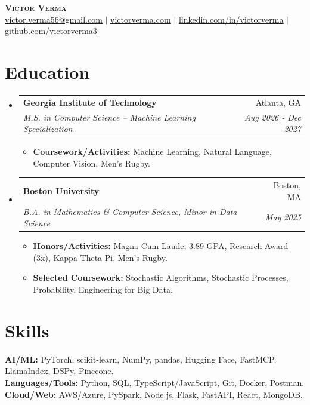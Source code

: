 \documentclass[letterpaper,11pt]{article}
\makeatletter
\newcommand{\resumeItem}[1]{
  \item\small{
    {#1 \vspace{-2pt}}
  }
}
\newcommand{\resumeSubheading}[4]{
  \vspace{-2pt}\item
    \begin{tabular*}{0.97\textwidth}[t]{l@{\extracolsep{\fill}}r}
      \textbf{#1} & #2 \\
      \textit{\small#3} & \textit{\small #4} \\
    \end{tabular*}\vspace{-7pt}
}
\newcommand{\resumeSubHeadingListStart}{\begin{itemize}[leftmargin=0.15in, label={}]}
\newcommand{\resumeSubHeadingListEnd}{\end{itemize}}
\newcommand{\resumeItemListStart}{\begin{itemize}}
\newcommand{\resumeItemListEnd}{\end{itemize}\vspace{-5pt}}
\makeatother
\begin{document}
\begin{center}
    \textbf{\Large \scshape Victor Verma} \\ \vspace{1pt}
    \href{mailto:victor.verma56@gmail.com}{\underline{victor.verma56@gmail.com}} $|$ 
    \href{https://www.victorverma.com}{\underline{victorverma.com}} $|$ 
    \href{https://linkedin.com/in/victorverma/}{\underline{linkedin.com/in/victorverma}} $|$
    \href{https://github.com/victorverma3}{\underline{github.com/victorverma3}}
\end{center}


\section{Education}
  \resumeSubHeadingListStart
    \resumeSubheading
      {Georgia Institute of Technology}{Atlanta, GA}
      {M.S. in Computer Science \--- Machine Learning Specialization}{Aug 2026 - Dec 2027}
      \resumeItemListStart
        \resumeItem{\textbf{Coursework/Activities:} Machine Learning, Natural Language, Computer Vision, Men's Rugby.}
      \resumeItemListEnd

    \resumeSubheading
      {Boston University}{Boston, MA}
      {B.A. in Mathematics \& Computer Science, Minor in Data Science}{May 2025}
      \resumeItemListStart
        \resumeItem{\textbf{Honors/Activities:} Magna Cum Laude, 3.89 GPA, Research Award (3x), Kappa Theta Pi, Men’s Rugby.}
        \resumeItem{\textbf{Selected Coursework:} Stochastic Algorithms, Stochastic Processes, Probability, Engineering for Big Data.}
      \resumeItemListEnd
  \resumeSubHeadingListEnd
  
\section{Skills}
 \begin{itemize}[leftmargin=0.15in, label={}]
    \small{\item{
     \textbf{AI/ML:}{ PyTorch, scikit-learn, NumPy, pandas, Hugging Face, FastMCP, LlamaIndex, DSPy, Pinecone.} \\
     \textbf{Languages/Tools:}{ Python, SQL, TypeScript/JavaScript, Git, Docker, Postman.} \\
     \textbf{Cloud/Web:}{ AWS/Azure, PySpark, Node.js, Flask, FastAPI, React, MongoDB.}
    }}
 \end{itemize}
\end{document}
